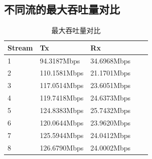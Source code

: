 \documentclass{article}
\begin{document}
\subsection{不同流的最大吞吐量对比}
\begin{table}[H]
	\caption{最大吞吐量对比}
	\centering
	\begin{tabular}{|l|l|l|l|l|}%
		\hline  %
		Stream	& Tx		& Rx		\\
		\hline
		1		& 94.3187Mbps	& 34.6968Mbps	\\
		\hline
		2		& 110.1581Mbps	& 21.1701Mbps	\\
		\hline
		3		& 117.0514Mbps	& 23.6051Mbps	\\
		\hline
		4		& 119.7418Mbps	& 24.6373Mbps	\\
		\hline
		5		& 124.8383Mbps	& 25.7432Mbps	\\
		\hline
		6		& 120.0644Mbps	& 23.9620Mbps	\\
		\hline
		7		& 125.5944Mbps	& 24.0412Mbps	\\
		\hline
		8		& 126.6790Mbps	& 24.0002Mbps	\\
		\hline  %
	\end{tabular}
\end{table}
\end{document}
